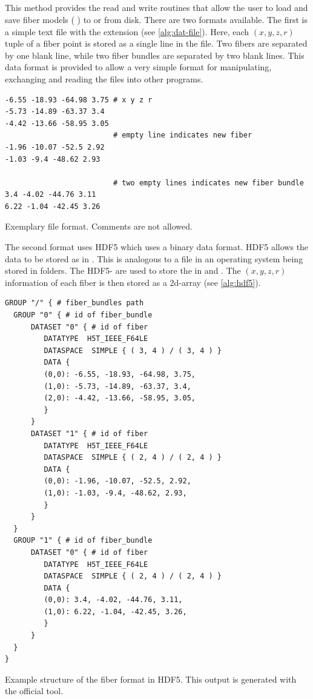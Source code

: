 \subsection{}
%
This method provides the read and write routines that allow the user to load and save fiber models (\ie{} ) to or from disk.
There are two formats available.
The first is a simple text file with the extension  (see \cref{alg:dat-file}).
Here, each $(x,y,z,r)$ tuple of a fiber point is stored as a single line in the file.
Two fibers are separated by one blank line, while two fiber bundles are separated by two blank lines.
This data format is provided to allow a very simple format for manipulating, exchanging and \eg{} reading the files into other programs.
\par
%
\begin{lstfloat}[!ht]
\begin{lstlisting}
-6.55 -18.93 -64.98 3.75 # x y z r
-5.73 -14.89 -63.37 3.4
-4.42 -13.66 -58.95 3.05
                         # empty line indicates new fiber
-1.96 -10.07 -52.5 2.92
-1.03 -9.4 -48.62 2.93

                         # two empty lines indicates new fiber bundle
3.4 -4.02 -44.76 3.11
6.22 -1.04 -42.45 3.26
\end{lstlisting}
\caption{Exemplary  file format. Comments are not allowed.}\label{alg:dat-file}
\end{lstfloat}
%
The second format uses \ac{HDF5} \cite{hdf5} which uses a binary data format.
\ac{HDF5} allows the data to be stored as  in .
This is analogous to a file in an operating system being stored in folders.
The \ac{HDF5}- are used to store the  in  and .
The $(x,y,z,r)$ information of each fiber is then stored as a 2d-array (see \cref{alg:hdf5}).
%
\begin{lstfloat}[!ht]
\begin{lstlisting}
GROUP "/" { # fiber_bundles path
  GROUP "0" { # id of fiber_bundle
      DATASET "0" { # id of fiber
         DATATYPE  H5T_IEEE_F64LE
         DATASPACE  SIMPLE { ( 3, 4 ) / ( 3, 4 ) }
         DATA {
         (0,0): -6.55, -18.93, -64.98, 3.75,
         (1,0): -5.73, -14.89, -63.37, 3.4,
         (2,0): -4.42, -13.66, -58.95, 3.05,
         }
      }
      DATASET "1" { # id of fiber
         DATATYPE  H5T_IEEE_F64LE
         DATASPACE  SIMPLE { ( 2, 4 ) / ( 2, 4 ) }
         DATA {
         (0,0): -1.96, -10.07, -52.5, 2.92,
         (1,0): -1.03, -9.4, -48.62, 2.93,
         }
      }
  }
  GROUP "1" { # id of fiber_bundle
      DATASET "0" { # id of fiber
         DATATYPE  H5T_IEEE_F64LE
         DATASPACE  SIMPLE { ( 2, 4 ) / ( 2, 4 ) }
         DATA {
         (0,0): 3.4, -4.02, -44.76, 3.11,
         (1,0): 6.22, -1.04, -42.45, 3.26,
         }
      }
  }
}
\end{lstlisting}
\caption{Example structure of the fiber format in \ac{HDF5}. This output is generated with the official  tool.} \label{alg:hdf5}
\end{lstfloat}
%
%
%
